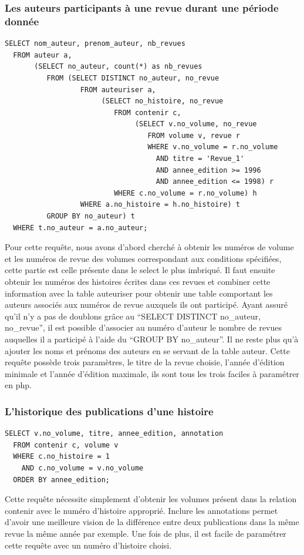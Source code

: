 \documentclass[12pt]{article}
\begin{document}
\subsubsection*{Les auteurs participants à une revue durant une période
donnée}
\begin{lstlisting}
SELECT nom_auteur, prenom_auteur, nb_revues
  FROM auteur a,
       (SELECT no_auteur, count(*) as nb_revues
          FROM (SELECT DISTINCT no_auteur, no_revue
                  FROM auteuriser a,
                       (SELECT no_histoire, no_revue
                          FROM contenir c,
                               (SELECT v.no_volume, no_revue
                                  FROM volume v, revue r
                                  WHERE v.no_volume = r.no_volume
                                    AND titre = 'Revue_1'
                                    AND annee_edition >= 1996
                                    AND annee_edition <= 1998) r
                          WHERE c.no_volume = r.no_volume) h
                  WHERE a.no_histoire = h.no_histoire) t
          GROUP BY no_auteur) t
  WHERE t.no_auteur = a.no_auteur;
\end{lstlisting}
Pour cette requête, nous avons d'abord cherché à obtenir les numéros de
volume et les numéros de revue des volumes correspondant aux conditions
spécifiées, cette partie est celle présente dans le select le plus imbriqué.
Il faut ensuite obtenir les numéros des histoires écrites dans ces revues et
combiner cette information avec la table auteuriser pour obtenir une table
comportant les auteurs associés aux numéros de revue auxquels ils ont
participé. Ayant assuré qu'il n'y a pas de doublons grâce au
``SELECT DISTINCT no\_auteur, no\_revue'', il est possible d'associer au
numéro d'auteur le nombre de revues auquelles il a participé à l'aide du
``GROUP BY no\_auteur''. Il ne reste plus qu'à ajouter les noms et prénoms
des auteurs en se servant de la table auteur. Cette requête possède trois
paramètres, le titre de la revue choisie, l'année d'édition minimale et
l'année d'édition maximale, ils sont tous les trois faciles à paramétrer en
php.

\subsubsection*{L'historique des publications d'une histoire}
\begin{lstlisting}
SELECT v.no_volume, titre, annee_edition, annotation
  FROM contenir c, volume v
  WHERE c.no_histoire = 1
    AND c.no_volume = v.no_volume
  ORDER BY annee_edition;
\end{lstlisting}
Cette requête nécessite simplement d'obtenir les volumes présent dans la
relation contenir avec le numéro d'histoire approprié. Inclure les
annotations permet d'avoir une meilleure vision de la différence entre deux
publications dans la même revue la même année par exemple. Une fois de plus,
il est facile de paramétrer cette requête avec un numéro d'histoire choisi.
\end{document}
